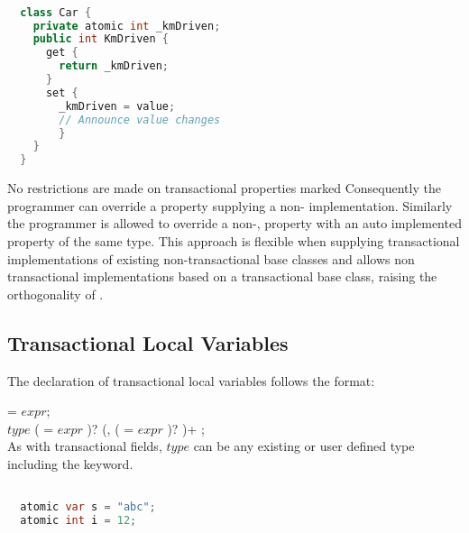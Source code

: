 \begin{lstlisting}[label=lst:atomic_property,
 caption={Manual Transactional Property},
 language=Java, 
 showspaces=false,
 showtabs=false,
 breaklines=true,
 showstringspaces=false,
 breakatwhitespace=true,
 commentstyle=\color{greencomments},
 keywordstyle=\color{bluekeywords},
 stringstyle=\color{redstrings},
 morekeywords={atomic, retry, orElse, var, get, set}]  % Start your code-block

  class Car {
    private atomic int _kmDriven;
    public int KmDriven {
      get {
        return _kmDriven;
      }
      set {
        _kmDriven = value;
        // Announce value changes
        }
    }
  }
\end{lstlisting}

No restrictions are made on transactional properties marked  Consequently the programmer can override a  property supplying a non- implementation. Similarly the programmer is allowed to override a non-,  property with an  auto implemented property of the same type. This approach is flexible when supplying transactional implementations of existing non-transactional base classes and allows non transactional implementations based on a transactional base class, raising the orthogonality of \stmname.

\subsection{Transactional Local Variables}\label{subsec:local_variables}
The declaration of transactional local variables follows the format:

   = $expr$;\\
 $type$  ( = $expr$ )? (,  ( = $expr$ )? )+ ;\\

As with transactional fields, $type$ can be any existing or user defined type including the  keyword.
\begin{lstlisting}[label=lst:local_variable,
 caption={Local Transactional Variable},
 language=Java, 
 showspaces=false,
 showtabs=false,
 breaklines=true,
 showstringspaces=false,
 breakatwhitespace=true,
 commentstyle=\color{greencomments},
 keywordstyle=\color{bluekeywords},
 stringstyle=\color{redstrings},
 morekeywords={atomic, retry, orElse, var, get, set}]  % Start your code-block

  atomic var s = "abc";
  atomic int i = 12; 
\end{lstlisting}

